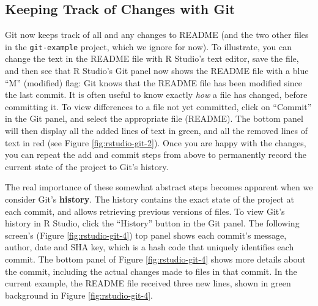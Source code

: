 \documentclass[
  american,
  ,doc,floatsintext]{apa6}
\begin{document}
\hypertarget{keeping-track-of-changes-with-git}{%
\subsection{Keeping Track of Changes with Git}\label{keeping-track-of-changes-with-git}}

Git now keeps track of all and any changes to README (and the two other files in the \texttt{git-example} project, which we ignore for now). To illustrate, you can change the text in the README file with R Studio's text editor, save the file, and then see that R Studio's Git panel now shows the README file with a blue ``M'' (modified) flag: Git knows that the README file has been modified since the last commit. It is often useful to know exactly \emph{how} a file has changed, before committing it. To view differences to a file not yet committed, click on ``Commit'' in the Git panel, and select the appropriate file (README). The bottom panel will then display all the added lines of text in green, and all the removed lines of text in red (see Figure \ref{fig:rstudio-git-2}). Once you are happy with the changes, you can repeat the add and commit steps from above to permanently record the current state of the project to Git's history.

The real importance of these somewhat abstract steps becomes apparent when we consider Git's \textbf{history}. The history contains the exact state of the project at each commit, and allows retrieving previous versions of files. To view Git's history in R Studio, click the ``History'' button in the Git panel. The following screen's (Figure \ref{fig:rstudio-git-4}) top panel shows each commit's message, author, date and SHA key, which is a hash code that uniquely identifies each commit. The bottom panel of Figure \ref{fig:rstudio-git-4} shows more details about the commit, including the actual changes made to files in that commit. In the current example, the README file received three new lines, shown in green background in Figure \ref{fig:rstudio-git-4}.
\end{document}

